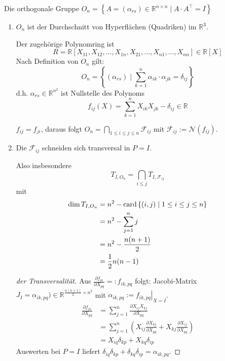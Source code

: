 \documentclass[parskip,a4paper,twoside,DIV15,BCOR12mm]{scrbook}
\begin{document}
\begin{example}
Die orthogonale Gruppe 
\(O_{n}=\left\{A=(\alpha_{rs})\in\mathbb{R}^{n\times n}\mid A\cdot A^{\top}=I\right\}\)
\begin{enumerate}
\item \(O_{n}\) ist der Durchschnitt von Hyperflächen (Quadriken) im 
\(\mathbb{R}^{3}\).

Der zugehörige Polynomring ist
\[
R=\mathbb{R}[X_{11},X_{12},\ldots,X_{1n},X_{21},\ldots,X_{n1},\ldots,X_{nn}]\in
    \mathbb{R}[X]
\]
Nach Definition von \(O_{n}\) gilt:
\[
O_{n}=\left\{
    (\alpha_{rs})\mid\sum_{k=1}^{n}{\alpha_{ik}\cdot\alpha_{jk}=\delta_{ij}}
    \right\}
\]
d.h. \(\alpha_{rs}\in\mathbb{R}^{n^{2}}\) ist Nullstelle des Polynoms
\[
f_{ij}(X)=\sum_{k=1}^{n}{X_{ik}X_{jk}-\delta_{ij}}\in\mathbb{R}
\]
\begin{note}
\(f_{ij}=f_{ji}\), daraus folgt 
    \(O_{n}=\bigcap_{1\leq i\leq j\leq n}{\mathcal{F}_{ij}}\) mit
\(\mathcal{F}_{ij}:=\mathcal{N}(f_{ij})\).
\end{note}
\item Die \(\mathcal{F}_{ij}\) schneiden sich transversal in \(P=I\).

Also insbesondere
\[
T_{I,O_{n}}=\bigcap_{i\leq j}{T_{I,\mathcal{F}_{ij}}}
\]
mit
\begin{align*}
\dim T_{I,O_{n}}&=n^{2}-\operatorname{card}\left\{(i,j)\mid 1\leq i\leq j\leq n\right\}\\
&=n^{2}-\sum_{j=1}^{n}{j}\\
&=n^{2}-\frac{n(n+1)}{2}\\
&=\frac{1}{2}n(n-1)
\end{align*}
\begin{proof}[der Transversalität]
Aus \(\frac{\partial f_{ik}}{\partial X_{pq}}=:f_{ik,pq}\) folgt: Jacobi-Matrix
\(J_{I}=\alpha_{ik,pq})\in\mathbb{R}^{\frac{n(n+1)}{2}\times n^{2}}\) mit
\(\alpha_{ik,pq}:=\left.f_{ik,pq}\right|_{X=I}\).
\begin{align*}
\frac{\partial f_{ik}}{\partial X_{pq}}
    &=\sum_{j=1}^{n}{\frac{\partial X_{ij}X_{kj}}{\partial X_{pq}}}\\
&=\sum_{j=1}^{n}{\left(
    X_{ij}\frac{\partial X_{kj}}{\partial X_{pq}}+
	X_{kj}\frac{\partial X_{ij}}{\partial X_{pq}}\right)}\\
&=X_{iq}\delta_{kp}+X_{kq}\delta_{ip}
\end{align*}
Auswerten bei \(P=I\) liefert 
\(\delta_{iq}\delta_{kp}+\delta_{kq}\delta_{ip}=\alpha_{ik,pq}\).


\end{proof}
\end{enumerate}
\end{example}
\end{document}
